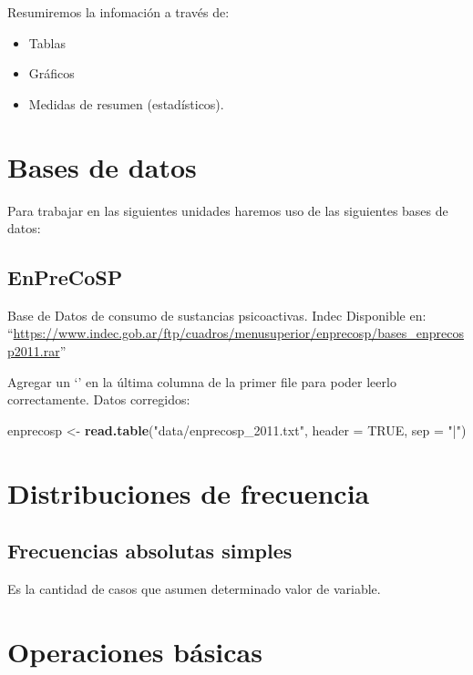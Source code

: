 \documentclass[spanish,]{book}
\newenvironment{Shaded}{\begin{snugshade}}{\end{snugshade}}
\newcommand{\KeywordTok}[1]{\textcolor[rgb]{0.13,0.29,0.53}{\textbf{#1}}}
\newcommand{\DataTypeTok}[1]{\textcolor[rgb]{0.13,0.29,0.53}{#1}}
\newcommand{\StringTok}[1]{\textcolor[rgb]{0.31,0.60,0.02}{#1}}
\newcommand{\OtherTok}[1]{\textcolor[rgb]{0.56,0.35,0.01}{#1}}
\newcommand{\NormalTok}[1]{#1}
\providecommand{\tightlist}{%
  \setlength{\itemsep}{0pt}\setlength{\parskip}{0pt}}
\begin{document}
Resumiremos la infomación a través de:

\begin{itemize}
\tightlist
\item
  Tablas
\item
  Gráficos
\item
  Medidas de resumen (estadísticos).
\end{itemize}

\chapter{Bases de datos}\label{bases-de-datos}

Para trabajar en las siguientes unidades haremos uso de las siguientes
bases de datos:

\section{EnPreCoSP}\label{enprecosp}

Base de Datos de consumo de sustancias psicoactivas. Indec Disponible
en:
``\url{https://www.indec.gob.ar/ftp/cuadros/menusuperior/enprecosp/bases_enprecosp2011.rar}''

Agregar un `\textbar{}' en la última columna de la primer file para
poder leerlo correctamente. Datos corregidos:

\begin{Shaded}
\begin{Highlighting}[]
\NormalTok{enprecosp <-}\StringTok{ }\KeywordTok{read.table}\NormalTok{(}\StringTok{"data/enprecosp_2011.txt"}\NormalTok{, }\DataTypeTok{header =} \OtherTok{TRUE}\NormalTok{, }\DataTypeTok{sep =} \StringTok{"|"}\NormalTok{)}
\end{Highlighting}
\end{Shaded}

\chapter{Distribuciones de
frecuencia}\label{distribuciones-de-frecuencia}

\section{Frecuencias absolutas
simples}\label{frecuencias-absolutas-simples}

Es la cantidad de casos que asumen determinado valor de variable.

\chapter{Operaciones básicas}\label{operaciones-basicas-1}
\end{document}
